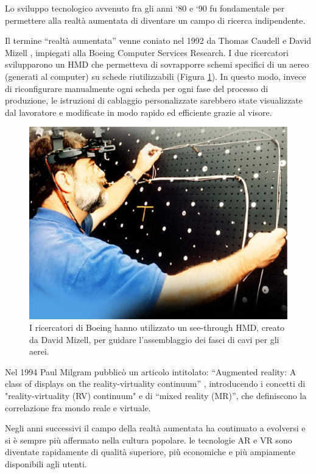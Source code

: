 Lo sviluppo tecnologico avvenuto fra gli anni ‘80 e ‘90 fu fondamentale per permettere alla realtà aumentata di diventare un campo di ricerca indipendente. 

Il termine “realtà aumentata” venne coniato nel 1992 da Thomas Caudell e David Mizell \cite{Caudell}, impiegati alla Boeing Computer Services Research.
I due ricercatori svilupparono un HMD che permetteva di sovrapporre schemi specifici di un aereo (generati al computer) su schede riutilizzabili (Figura \ref{fig:figure12}). 
In questo modo, invece di riconfigurare manualmente ogni scheda per ogni fase del processo di produzione, le istruzioni di cablaggio personalizzate sarebbero state visualizzate dal lavoratore e modificate in modo rapido ed efficiente grazie al visore.

\begin{figure}[t]
    \centering
    \includegraphics[width=\textwidth]{images/David-Mizell-AR.jpg}
    \caption{I ricercatori di Boeing hanno utilizzato un see-through HMD, creato da David Mizell, per guidare l'assemblaggio dei fasci di cavi per gli aerei.}
    \label{fig:figure12}
\end{figure}

Nel 1994 Paul Milgram pubblicò un articolo intitolato: “Augmented reality: A class of displays on the reality-virtuality continuum” \cite{Milgram}, introducendo i concetti di "reality-virtuality (RV) continuum" e di “mixed reality (MR)”, che definiscono la correlazione fra mondo reale e virtuale.

Negli anni successivi il campo della realtà aumentata ha continuato a evolversi e si è sempre più affermato nella cultura popolare. le tecnologie AR e VR sono diventate rapidamente di qualità superiore, più economiche e più ampiamente disponibili agli utenti.
\newpage
